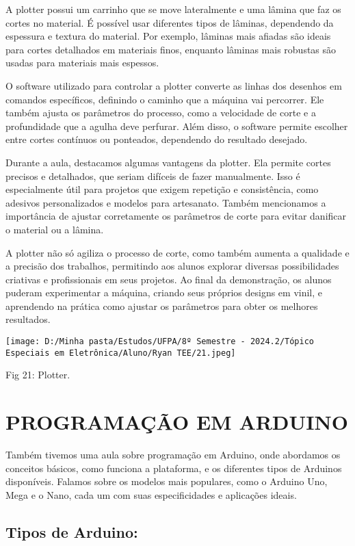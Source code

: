 \documentclass[
]{book}
\begin{document}
A plotter possui um carrinho que se move lateralmente e uma lâmina que faz os cortes no material. É possível usar diferentes tipos de lâminas, dependendo da espessura e textura do material. Por exemplo, lâminas mais afiadas são ideais para cortes detalhados em materiais finos, enquanto lâminas mais robustas são usadas para materiais mais espessos.

O software utilizado para controlar a plotter converte as linhas dos desenhos em comandos específicos, definindo o caminho que a máquina vai percorrer. Ele também ajusta os parâmetros do processo, como a velocidade de corte e a profundidade que a agulha deve perfurar. Além disso, o software permite escolher entre cortes contínuos ou ponteados, dependendo do resultado desejado.

Durante a aula, destacamos algumas vantagens da plotter. Ela permite cortes precisos e detalhados, que seriam difíceis de fazer manualmente. Isso é especialmente útil para projetos que exigem repetição e consistência, como adesivos personalizados e modelos para artesanato. Também mencionamos a importância de ajustar corretamente os parâmetros de corte para evitar danificar o material ou a lâmina.

A plotter não só agiliza o processo de corte, como também aumenta a qualidade e a precisão dos trabalhos, permitindo aos alunos explorar diversas possibilidades criativas e profissionais em seus projetos. Ao final da demonstração, os alunos puderam experimentar a máquina, criando seus próprios designs em vinil, e aprendendo na prática como ajustar os parâmetros para obter os melhores resultados.

\texttt{[image: D:/Minha pasta/Estudos/UFPA/8º Semestre - 2024.2/Tópico Especiais em Eletrônica/Aluno/Ryan TEE/21.jpeg]}

Fig 21: Plotter.

\chapter{PROGRAMAÇÃO EM ARDUINO}\label{programauxe7uxe3o-em-arduino}

Também tivemos uma aula sobre programação em Arduino, onde abordamos os conceitos básicos, como funciona a plataforma, e os diferentes tipos de Arduinos disponíveis. Falamos sobre os modelos mais populares, como o Arduino Uno, Mega e o Nano, cada um com suas especificidades e aplicações ideais.

\section{Tipos de Arduino:}\label{tipos-de-arduino}
\end{document}
